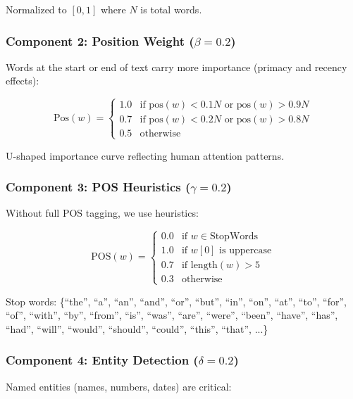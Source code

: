 Normalized to $[0, 1]$ where $N$ is total words.

\subsubsection{Component 2: Position Weight ($\beta = 0.2$)}

Words at the start or end of text carry more importance (primacy and recency effects):

\begin{equation}
\text{Pos}(w) = \begin{cases}
1.0 & \text{if } \text{pos}(w) < 0.1N \text{ or } \text{pos}(w) > 0.9N \\
0.7 & \text{if } \text{pos}(w) < 0.2N \text{ or } \text{pos}(w) > 0.8N \\
0.5 & \text{otherwise}
\end{cases}
\end{equation}

U-shaped importance curve reflecting human attention patterns.

\subsubsection{Component 3: POS Heuristics ($\gamma = 0.2$)}

Without full POS tagging, we use heuristics:

\begin{equation}
\text{POS}(w) = \begin{cases}
0.0 & \text{if } w \in \text{StopWords} \\
1.0 & \text{if } w[0] \text{ is uppercase} \\
0.7 & \text{if length}(w) > 5 \\
0.3 & \text{otherwise}
\end{cases}
\end{equation}

Stop words: \{``the'', ``a'', ``an'', ``and'', ``or'', ``but'', ``in'', ``on'', ``at'', ``to'', ``for'', ``of'', ``with'', ``by'', ``from'', ``is'', ``was'', ``are'', ``were'', ``been'', ``have'', ``has'', ``had'', ``will'', ``would'', ``should'', ``could'', ``this'', ``that'', ...\}

\subsubsection{Component 4: Entity Detection ($\delta = 0.2$)}

Named entities (names, numbers, dates) are critical:

